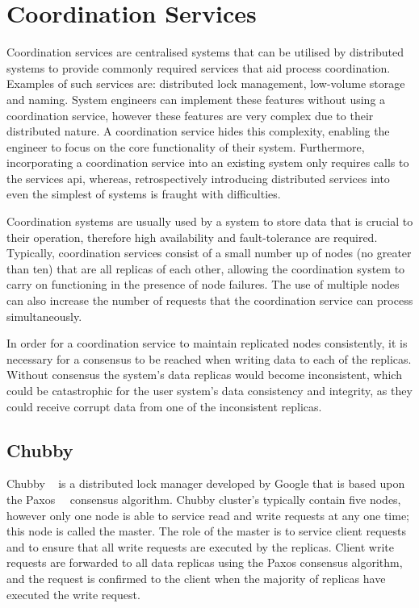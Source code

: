 \section{Coordination Services}
Coordination services are centralised systems that can be utilised by distributed systems to provide commonly required services that aid process coordination. Examples of such services are: distributed lock management, low-volume storage and naming. System engineers can implement these features without using a coordination service, however these features are very complex due to their distributed nature\citep{Burrows:2006:CLS:1298455.1298487}. A coordination service hides this complexity, enabling the engineer to focus on the core functionality of their system. Furthermore, incorporating a coordination service into an existing system only requires calls to the services api, whereas, retrospectively introducing distributed services into even the simplest of systems is fraught with difficulties. 

Coordination systems are usually used by a system to store data that is crucial to their operation, therefore high availability and fault-tolerance are required. Typically, coordination services consist of a small number up of nodes (no greater than ten) that are all replicas of each other, allowing the coordination system to carry on functioning in the presence of node failures. The use of multiple nodes can also increase the number of requests that the coordination service can process simultaneously. 

In order for a coordination service to maintain replicated nodes consistently, it is necessary for a consensus to be reached when writing data to each of the replicas. Without consensus the system's data replicas would become inconsistent, which could be catastrophic for the user system's data consistency and integrity, as they could receive corrupt data from one of the inconsistent replicas. 

	\subsection{Chubby}
	Chubby ~\cite{Burrows:2006:CLS:1298455.1298487} is a distributed lock manager developed by Google that is based upon the Paxos~\cite{Lamport:1998:PP:279227.279229}~\cite{Lamport:2001:PaxosMadeSimple} consensus algorithm. Chubby cluster's typically contain five nodes, however only one node is able to service read and write requests at any one time; this node is called the master. The role of the master is to service client requests and to ensure that all write requests are executed by the replicas. Client write requests are forwarded to all data replicas using the Paxos consensus algorithm, and the request is confirmed to the client when the majority of replicas have executed the write request. 

